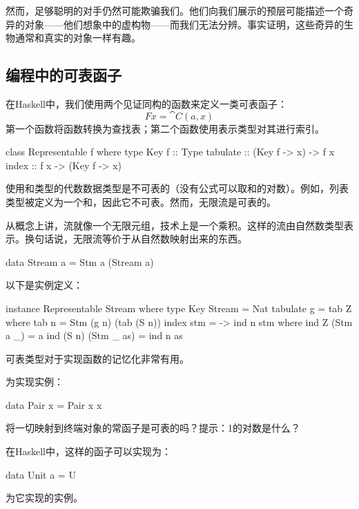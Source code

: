 \documentclass[DaoFP]{subfiles}
\begin{document}
然而，足够聪明的对手仍然可能欺骗我们。他们向我们展示的预层可能描述一个奇异的对象——他们想象中的虚构物——而我们无法分辨。事实证明，这些奇异的生物通常和真实的对象一样有趣。

\subsection{编程中的可表函子}

在Haskell中，我们使用两个见证同构的函数来定义一类可表函子：
\[ F x = \cat C(a, x) \]
第一个函数将函数转换为查找表；第二个函数使用表示类型对其进行索引。

\begin{haskell}
class Representable f where
  type Key f :: Type
  tabulate :: (Key f -> x) -> f x
  index    :: f x -> (Key f -> x)
\end{haskell}

使用和类型的代数数据类型是不可表的（没有公式可以取和的对数）。例如，列表类型被定义为一个和，因此它不可表。然而，无限流是可表的。

从概念上讲，流就像一个无限元组，技术上是一个乘积。这样的流由自然数类型表示。换句话说，无限流等价于从自然数映射出来的东西。
\begin{haskell}
data Stream a = Stm a (Stream a)
\end{haskell}
以下是实例定义：
\begin{haskell}
instance Representable Stream where
  type Key Stream = Nat
  tabulate g = tab Z
    where
      tab n = Stm (g n) (tab (S n))
  index stm = \n -> ind n stm
    where
      ind Z (Stm a _) = a
      ind (S n) (Stm _ as) = ind n as
\end{haskell}
可表类型对于实现函数的记忆化非常有用。

\begin{exercise}
为实现实例：
\begin{haskell}
data Pair x = Pair x x
\end{haskell}
\end{exercise}

\begin{exercise}
将一切映射到终端对象的常函子是可表的吗？提示：1的对数是什么？

在Haskell中，这样的函子可以实现为：
\begin{haskell}
data Unit a = U
\end{haskell}
为它实现的实例。
\end{exercise}
\end{document}
